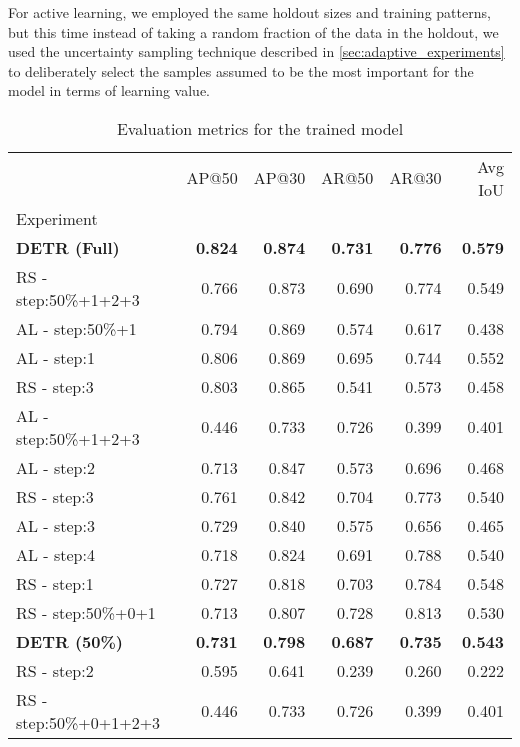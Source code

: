 \documentclass[../main.tex]{subfiles}
\begin{document}
For active learning, we employed the same holdout sizes and training patterns, but this time instead of taking a random fraction of the data in the holdout, we used the uncertainty sampling technique described in \ref{sec:adaptive_experiments} to deliberately select the samples assumed to be the most important for the model in terms of learning value. 


\begin{table}[h!]
    \centering
    \caption{Evaluation metrics for the trained model}
    \label{tab:eval_metrics}
    \begin{tabular}{lrrrrr}
    \toprule
    {} &  AP@50 &  AP@30 &  AR@50 &  AR@30 &  Avg IoU \\
    Experiment         &        &        &        &        &          \\
    \midrule
    \textbf{DETR (Full)} & \textbf{0.824} & \textbf{0.874} & \textbf{0.731} & \textbf{0.776} & \textbf{0.579} \\
    RS - step:50\%+1+2+3   &  0.766 &  0.873 &  0.690 &  0.774 &    0.549 \\
    AL - step:50\%+1 &  0.794 &  0.869 &  0.574 &  0.617 &    0.438 \\
    AL - step:1        &  0.806 &  0.869 &  0.695 &  0.744 &    0.552 \\
    RS - step:3        &  0.803 &  0.865 &  0.541 &  0.573 &    0.458 \\
    AL - step:50\%+1+2+3 &  0.446 &  0.733 &  0.726 &  0.399 &    0.401 \\
    AL - step:2        &  0.713 &  0.847 &  0.573 &  0.696 &    0.468 \\
    RS - step:3 &  0.761 &  0.842 &  0.704 &  0.773 &    0.540 \\
    AL - step:3        &  0.729 &  0.840 &  0.575 &  0.656 &    0.465 \\
    AL - step:4        &  0.718 &  0.824 &  0.691 &  0.788 &    0.540 \\
    RS - step:1        &  0.727 &  0.818 &  0.703 &  0.784 &    0.548 \\
    RS - step:50\%+0+1 &  0.713 &  0.807 &  0.728 &  0.813 &    0.530 \\
    \textbf{DETR (50\%)} & \textbf{0.731 }&	\textbf{0.798 }& \textbf{0.687} &	\textbf{0.735} &	\textbf{0.543} \\
    RS - step:2        &  0.595 &  0.641 &  0.239 &  0.260 &    0.222 \\
    RS - step:50\%+0+1+2+3 &  0.446 &  0.733 &  0.726 &  0.399 &    0.401 \\
    \bottomrule
    \end{tabular}
    \end{table}
\end{document}
